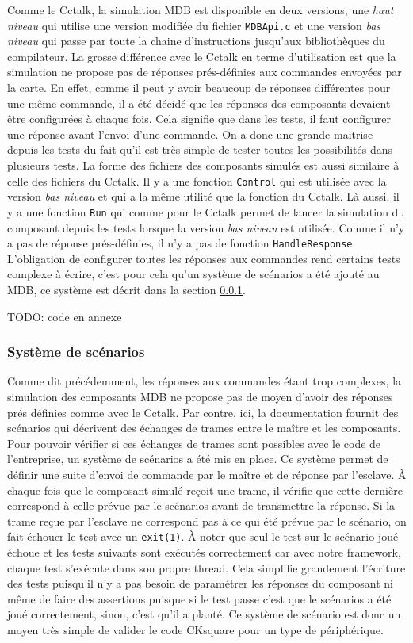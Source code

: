 \documentclass[a4paper]{article}
\begin{document}
Comme le Cctalk, la simulation MDB est disponible en deux versions, une
\textit{haut niveau} qui utilise une version modifiée du fichier \verb|MDBApi.c|
et une version \textit{bas niveau} qui passe par toute la chaine d'instructions
jusqu'aux bibliothèques du compilateur. La grosse différence avec le Cctalk en
terme d'utilisation est que la simulation ne propose pas de réponses
prés-définies aux commandes envoyées par la carte. En effet, comme il peut y
avoir beaucoup de réponses différentes pour une même commande, il a été décidé
que les réponses des composants devaient être configurées à chaque fois. Cela
signifie que dans les tests, il faut configurer une réponse avant l'envoi d'une
commande. On a donc une grande maitrise depuis les tests du fait qu'il est très
simple de tester toutes les possibilités dans plusieurs tests. La forme des
fichiers des composants simulés est aussi similaire à celle des fichiers du
Cctalk. Il y a une fonction \verb|Control| qui est utilisée avec la version
\textit{bas niveau} et qui a la même utilité que la fonction du Cctalk. Là
aussi, il y a une fonction \verb|Run| qui comme pour le Cctalk permet de lancer
la simulation du composant depuis les tests lorsque la version \textit{bas
niveau} est utilisée. Comme il n'y a pas de réponse prés-définies, il n'y a pas
de fonction \verb|HandleResponse|. L'obligation de configurer toutes les
réponses aux commandes rend certains tests complexe à écrire, c'est pour cela
qu'un système de scénarios a été ajouté au MDB, ce système est décrit dans la
section \ref{sysscenar}.

TODO: code en annexe

\subsubsection{Système de scénarios}
\label{sysscenar}

Comme dit précédemment, les réponses aux commandes étant trop complexes, la
simulation des composants MDB ne propose pas de moyen d'avoir des réponses prés
définies comme avec le Cctalk. Par contre, ici, la documentation fournit des
scénarios qui décrivent des échanges de trames entre le maître et les
composants. Pour pouvoir vérifier si ces échanges de trames sont possibles avec
le code de l'entreprise, un système de scénarios a été mis en place. Ce système
permet de définir une suite d'envoi de commande par le maître et de réponse par
l'esclave. À chaque fois que le composant simulé reçoit une trame, il vérifie
que cette dernière correspond à celle prévue par le scénarios avant de
transmettre la réponse. Si la trame reçue par l'esclave ne correspond pas à ce
qui été prévue par le scénario, on fait échouer le test avec un \verb|exit(1)|.
À noter que seul le test sur le scénario joué échoue et les tests suivants sont
exécutés correctement car avec notre framework, chaque test s'exécute dans son
propre thread. Cela simplifie grandement l'écriture des tests puisqu'il n'y a
pas besoin de paramétrer les réponses du composant ni même de faire des
assertions puisque si le test passe c'est que le scénarios a été joué
correctement, sinon, c'est qu'il a planté. Ce système de scénario est donc un
moyen très simple de valider le code CKsquare pour un type de périphérique.
\end{document}
